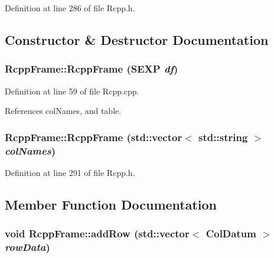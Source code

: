 Definition at line 286 of file Rcpp.h.

\subsection{Constructor \& Destructor Documentation}
\hypertarget{classRcppFrame_2aad548eb7d3842ea12da3c5a67bbfbc}{
\subsubsection[{RcppFrame}]{\setlength{\rightskip}{0pt plus 5cm}RcppFrame::RcppFrame (SEXP {\em df})}}
\label{classRcppFrame_2aad548eb7d3842ea12da3c5a67bbfbc}




Definition at line 59 of file Rcpp.cpp.

References colNames, and table.\hypertarget{classRcppFrame_d3caf84a0543c0f31a97705be8902358}{
\subsubsection[{RcppFrame}]{\setlength{\rightskip}{0pt plus 5cm}RcppFrame::RcppFrame (std::vector$<$ std::string $>$ {\em colNames})}}
\label{classRcppFrame_d3caf84a0543c0f31a97705be8902358}




Definition at line 291 of file Rcpp.h.

\subsection{Member Function Documentation}
\hypertarget{classRcppFrame_ae72791527f2947a477633151106f42c}{
\subsubsection[{addRow}]{\setlength{\rightskip}{0pt plus 5cm}void RcppFrame::addRow (std::vector$<$ {\bf ColDatum} $>$ {\em rowData})}}
\label{classRcppFrame_ae72791527f2947a477633151106f42c}




